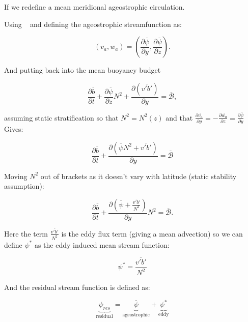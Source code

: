If we redefine a mean meridional ageostrophic circulation.

Using ~ and  defining the ageostrophic streamfunction as:

\begin{equation}
(\overline{v_a},\overline{w_a})=(\frac{\partial \overline{\psi} }{\partial y},\frac{\partial \overline{\psi}}{\partial z}).
\end{equation}

And putting back into the mean buoyancy budget 

\begin{equation*}
\frac{\partial\overline{b}}{\partial t} + \frac{\partial \overline{\psi}}{\partial z}N^2 + \frac{\partial (\overline{v'b'})}{\partial y} = \overline{\mathcal{B}},
\end{equation*}


assuming static stratification so that $N^2=N^2(z)$ and 
that $\frac{\partial \overline{v_a}}{\partial y} = - \frac{\partial \overline{w_a}}{\partial z} =\frac{\partial \overline{\psi}}{\partial y} $
Gives:

\begin{equation}
\frac{\partial\overline{b}}{\partial t} + \frac{\partial (\overline{\psi } N^2 +\overline{v'b'})}{\partial y} = \overline{\mathcal{B}}
\end{equation}

Moving $N^2$ out of brackets as it doesn't vary with latitude (static stability assumption):

\begin{equation}
\frac{\partial\overline{b}}{\partial t} + \frac{\partial (\overline{\psi} +\frac{\overline{v'b'}}{N^2})}{\partial y}N^2 = \overline{\mathcal{B}}.
\end{equation}

Here the term $\frac{\overline{v'b'}}{N^2}$ is the eddy flux term (giving a mean advection) so we can define $\psi ^* $ as the eddy induced mean stream function:

\begin{equation}
\psi ^* = \frac{\overline{v'b'}}{N^2}
\label{eq:eddyflux}
\end{equation}

And the residual stream function is defined as:

\begin{equation}
\underbrace{\psi _{res}}_\text{residual}= \underbrace{\overline{\psi}}_\text{ageostrophic} + \underbrace{\psi ^*}_\text{eddy}
\end{equation}

